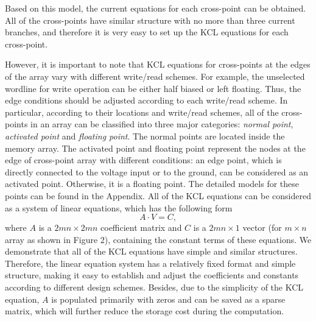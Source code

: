 Based on this model, the current equations for each cross-point can be
obtained. All of the cross-points have similar structure with no more than
three current branches, and therefore it is very easy to set up the KCL
equations for each cross-point.

However, it is important to note that KCL equations for cross-points at
the edges of the array vary with different write/read schemes. For
example, the unselected wordline for write operation can be either half
biased or left floating. Thus, the edge conditions should be adjusted
according to each write/read scheme. In particular, according to their
locations and write/read schemes, all of the cross-points in an array can
be classified into three major categories: \emph{normal point},
\emph{activated point} and \emph{floating point}. The normal points are
located inside the memory array. The activated point and floating point
represent the nodes at the edge of cross-point array with different
conditions: an edge point, which is directly connected to the voltage
input or to the ground, can be considered as an activated point.
Otherwise, it is a floating point. The detailed models for these points
can be found in the Appendix. All of the KCL equations can be considered as a system of linear equations, which has the following form
\begin{equation}\label{equ:matrix}
A\cdot V = C,
\end{equation}
where $A$ is a ${2mn\times{2mn}}$ coefficient matrix and $C$ is a
${2mn\times{1}}$ vector (for $m\times{n}$ array as shown in Figure 2), containing the constant terms of these equations.
We demonstrate that all of the KCL equations have simple and similar
structures. Therefore, the linear equation system has a relatively fixed
format and simple structure, making it easy to establish and adjust the
coefficients and constants according to different design schemes. Besides,
due to the simplicity of the KCL equation, $A$ is populated primarily with
zeros and can be saved as a sparse matrix, which will further reduce the
storage cost during the computation.

